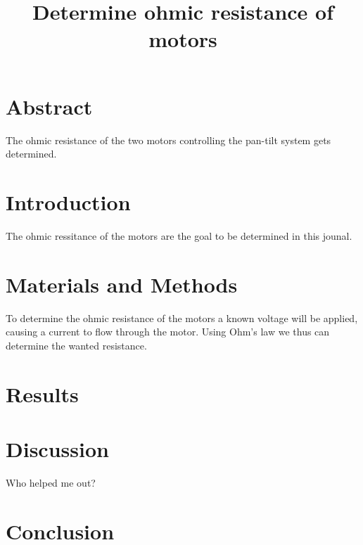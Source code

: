 \documentclass[../../rapport/main]{article}
\title{Determine ohmic resistance of motors}
\begin{document}
\section{Abstract}
The ohmic resistance of the two motors controlling the pan-tilt system gets determined.
\section{Introduction}
The ohmic ressitance of the motors are the goal to be determined in this jounal.
\section{Materials and Methods}
To determine the ohmic resistance of the motors a known voltage will be applied, causing a current to flow through the motor. Using Ohm's law we thus can determine the wanted resistance.
\section{Results}




\section{Discussion}
Who helped me out?
\section{Conclusion}
\end{document}
